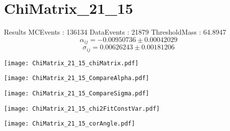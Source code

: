 \documentclass[a4paper,12pt]{article}
\begin{document}
\section{ChiMatrix\_21\_15}
\begin{minipage}{0.49\linewidth} Results \newline
MCEvents : 136134\newline
DataEvents : 21879 \newline
ThresholdMass : 64.8947\\
$$\alpha_{ij} = -0.00950736\pm 0.00042029$$
$$\sigma_{ij} = 0.00626243\pm 0.00181206$$
\end{minipage}\hfill
\begin{minipage}{0.49\linewidth} 
\texttt{[image: ChiMatrix\_21\_15\_chiMatrix.pdf]}\\
\end{minipage}
\hfill
\begin{minipage}{0.49\linewidth} 
\texttt{[image: ChiMatrix\_21\_15\_CompareAlpha.pdf]}\\
\end{minipage}
\hfill
\begin{minipage}{0.49\linewidth} 
\texttt{[image: ChiMatrix\_21\_15\_CompareSigma.pdf]}\\
\end{minipage}
\begin{minipage}{0.49\linewidth} 
\texttt{[image: ChiMatrix\_21\_15\_chi2FitConstVar.pdf]}\\
\end{minipage}
\hfill
\begin{minipage}{0.49\linewidth} 
\texttt{[image: ChiMatrix\_21\_15\_corAngle.pdf]}\\
\end{minipage}
\end{document}
